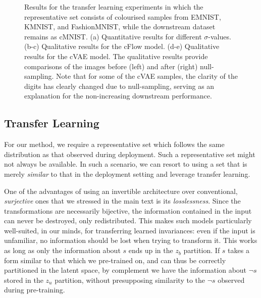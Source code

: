 \begin{figure}[htb]
{      \label{fig:cvae_tl_xd}
  }
  \caption{
    Results for the transfer learning experiments in which the representative set consists of colourised samples from EMNIST, KMNIST, and FashionMNIST, while the downstream dataset remains as cMNIST. (a) Quantitative results for different $\sigma$-values. (b-c) Qualitative results for the cFlow model.
    (d-e) Qualitative results for the cVAE model. The qualitative results provide comparisons of the images before (left) and after (right) null-sampling. Note that for some of the cVAE samples, the clarity of the digits has clearly changed due to null-sampling, serving as an explanation for the non-increasing downstream performance.
  }%
  \label{fig:cmnist-transfer-all}
  
\end{figure}

\subsection{Transfer Learning}\label{sec:transfer-learning}
\noindent For our method, we require a representative set which follows the same distribution as that observed during deployment.
Such a representative set might not always be available.
In such a scenario, we can resort to using a set that is merely \emph{similar} to that in the deployment setting and leverage transfer learning.

One of the advantages of using an invertible architecture over conventional, \emph{surjective} ones that we stressed in the main text is its \emph{losslessness}. Since the transformations are necessarily bijective, the information contained in the input can never be destroyed, only redistributed. This makes such models particularly well-suited, in our minds, for transferring learned invariances:
even if the input is unfamiliar, no information should be lost when trying to transform it.
This works as long as only the information about $s$ ends up in the $z_b$ partition.
If $s$ takes a form similar to that which we pre-trained on, and can thus be correctly partitioned in the latent space, by complement we have the information about $\neg s$ stored in the $z_u$ partition, without presupposing similarity to the $\neg s$ observed during pre-training.

